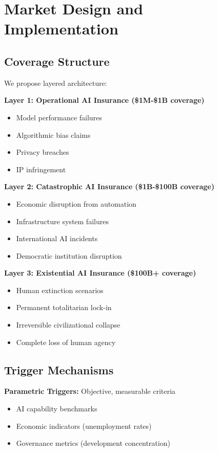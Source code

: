 \documentclass[11pt]{article}
\begin{document}
\section{Market Design and Implementation}

\subsection{Coverage Structure}

We propose layered architecture:

\textbf{Layer 1: Operational AI Insurance (\$1M-\$1B coverage)}
\begin{itemize}
   \item Model performance failures
   \item Algorithmic bias claims
   \item Privacy breaches
   \item IP infringement
\end{itemize}

\textbf{Layer 2: Catastrophic AI Insurance (\$1B-\$100B coverage)}
\begin{itemize}
   \item Economic disruption from automation
   \item Infrastructure system failures
   \item International AI incidents
   \item Democratic institution disruption
\end{itemize}

\textbf{Layer 3: Existential AI Insurance (\$100B+ coverage)}
\begin{itemize}
   \item Human extinction scenarios
   \item Permanent totalitarian lock-in
   \item Irreversible civilizational collapse
   \item Complete loss of human agency
\end{itemize}

\subsection{Trigger Mechanisms}

\textbf{Parametric Triggers:} Objective, measurable criteria
\begin{itemize}
   \item AI capability benchmarks
   \item Economic indicators (unemployment rates)
   \item Governance metrics (development concentration)
\end{itemize}
\end{document}
